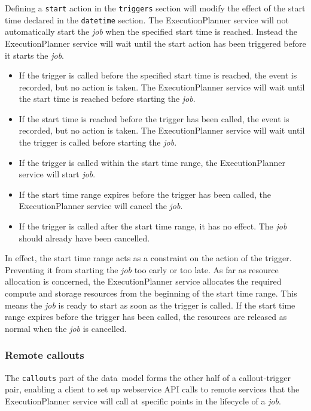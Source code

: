 \documentclass[11pt,a4paper]{ivoa}
\newcommand{\datamodel} {data~model}
\newcommand{\webservice} {webservice}
\newcommand{\execplanner} {ExecutionPlanner}
\newcommand{\codeword}[1] {\texttt{#1}}
\newcommand{\job} {\textit{job}}
\begin{document}
Defining a \codeword{start} action in the \codeword{triggers} section will modify the effect of the
start time declared in the \codeword{datetime} section.
The \execplanner{} service will not automatically start the \job{} when the specified start time is reached.
Instead the \execplanner{} service will wait until the start action has been triggered before it starts the \job{}.

\begin{itemize}
    \item If the trigger is called before the specified start time is reached, the event is recorded,
    but no action is taken.
    The \execplanner{} service will wait until the start time is reached before starting the \job{}.
    \item If the start time is reached before the trigger has been called, the event is recorded,
    but no action is taken. The \execplanner{} service will wait until the trigger is called before starting the \job{}.
    \item If the trigger is called within the start time range, the \execplanner{} service will start \job{}.
    \item If the start time range expires before the trigger has been called, the \execplanner{} service will cancel the \job{}.
    \item If the trigger is called after the start time range, it has no effect. The \job{} should already have been cancelled.
\end{itemize}

In effect, the start time range acts as a constraint on the action of the trigger. Preventing it from starting the \job{} too early
or too late.
As far as resource allocation is concerned, the \execplanner{} service allocates the required compute and storage resources
from the beginning of the start time range. This means the \job{} is ready to start as soon as the trigger is called.
If the start time range expires before the trigger has been called, the resources are released as normal
when the \job{} is cancelled.

\subsubsection{Remote callouts}
\label{callouts}

The \codeword{callouts} part of the \datamodel{} forms the other half of a callout-trigger pair,
enabling a client to set up \webservice{} API calls to remote services that the \execplanner{} service will
call at specific points in the lifecycle of a \job{}.
\end{document}
